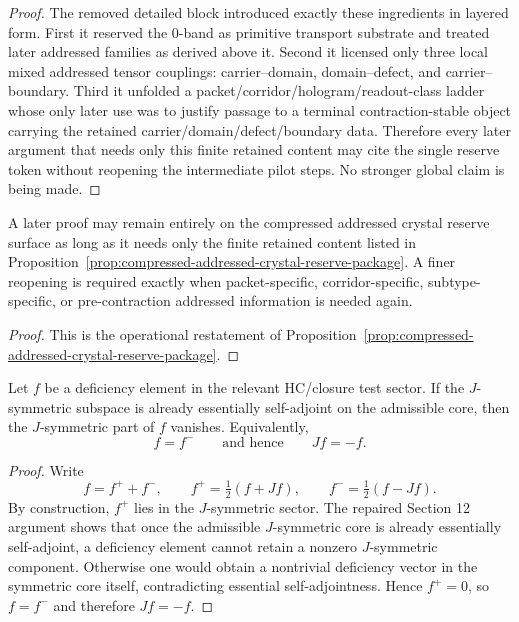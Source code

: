 \begin{proof}
The removed detailed block introduced exactly these ingredients in layered form. First it reserved the 0-band as primitive transport substrate and treated later addressed families as derived above it. Second it licensed only three local mixed addressed tensor couplings: carrier--domain, domain--defect, and carrier--boundary. Third it unfolded a packet/corridor/hologram/readout-class ladder whose only later use was to justify passage to a terminal contraction-stable object carrying the retained carrier/domain/defect/boundary data. Therefore every later argument that needs only this finite retained content may cite the single reserve token without reopening the intermediate pilot steps. No stronger global claim is being made.
\end{proof}

\begin{corollary}
\label{cor:use-rule-for-the-compressed-addressed-crystal-reserve-surface}
A later proof may remain entirely on the compressed addressed crystal reserve surface as long as it needs only the finite retained content listed in Proposition~\ref{prop:compressed-addressed-crystal-reserve-package}. A finer reopening is required exactly when packet-specific, corridor-specific, subtype-specific, or pre-contraction addressed information is needed again.
\end{corollary}

\begin{proof}
This is the operational restatement of Proposition~\ref{prop:compressed-addressed-crystal-reserve-package}.
\end{proof}

\begin{lemma}
\label{lem:closed-deficiency-antisymmetry}
Let $f$ be a deficiency element in the relevant HC/closure test sector. If the
$J$-symmetric subspace is already essentially self-adjoint on the admissible
core, then the $J$-symmetric part of $f$ vanishes. Equivalently,
\[
 f=f^-\qquad\text{and hence}\qquad Jf=-f.
\]
\end{lemma}

\begin{proof}
Write
\[
 f=f^+ + f^-,\qquad f^+=\tfrac12(f+Jf),\qquad f^- = \tfrac12(f-Jf).
\]
By construction, $f^+$ lies in the $J$-symmetric sector. The repaired Section 12
argument shows that once the admissible $J$-symmetric core is already
essentially self-adjoint, a deficiency element cannot retain a nonzero
$J$-symmetric component. Otherwise one would obtain a nontrivial deficiency
vector in the symmetric core itself, contradicting essential self-adjointness.
Hence $f^+=0$, so $f=f^-$ and therefore $Jf=-f$.
\end{proof}

